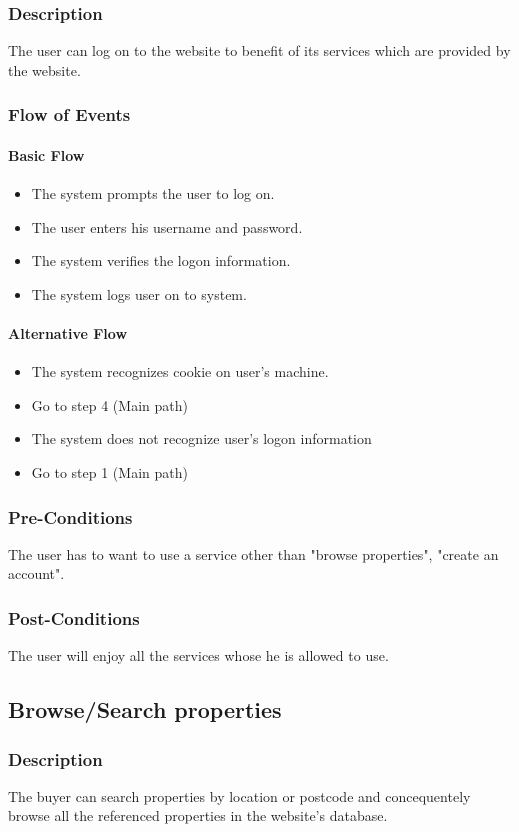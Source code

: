 \documentclass[a4paper,12pt]{article}
\begin{document}
\subsubsection{Description}
The user can log on to the website to benefit of its services which are provided by the website.
\subsubsection{Flow of Events}
\paragraph{Basic Flow}
\begin{itemize}
\item The system prompts the user to log on.
\item The user enters his username and password. 
\item The system verifies the logon information. 
\item The system logs user on to system.
\end{itemize}
\paragraph{Alternative Flow}
\begin{itemize}
\item The system recognizes cookie on user's machine. 
\item Go to step 4 (Main path)
\item The system does not recognize user's logon information 
\item Go to step 1 (Main path)
\end{itemize}
\subsubsection{Pre-Conditions}
The user has to want to use a service other than "browse properties", "create an account".
\subsubsection{Post-Conditions}
The user will enjoy all the services whose he is allowed to use.

\subsection{Browse/Search properties}
\subsubsection{Description}
The buyer can search properties by location or postcode and concequentely browse all the referenced properties in the website's database.
\end{document}
